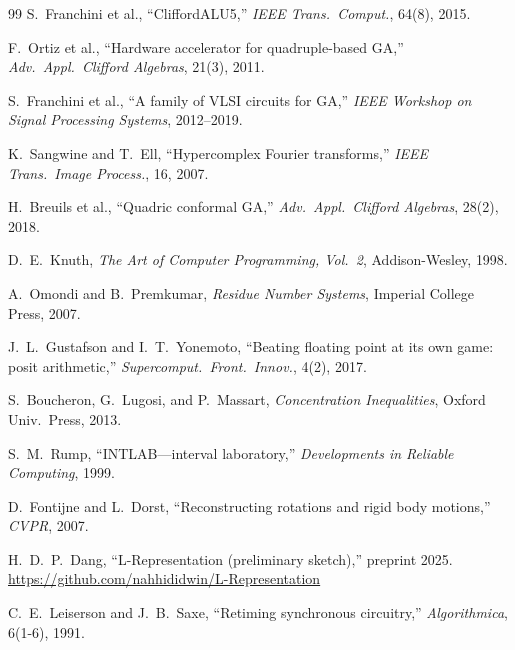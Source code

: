 \documentclass[11pt,a4paper]{article}
\theoremstyle{definition}
\theoremstyle{plain}
\theoremstyle{remark}
\begin{document}
\begin{thebibliography}{99}
S.~Franchini et al., ``CliffordALU5,''
\emph{IEEE Trans.\ Comput.}, 64(8), 2015.

F.~Ortiz et al., ``Hardware accelerator for quadruple-based GA,''
\emph{Adv.\ Appl.\ Clifford Algebras}, 21(3), 2011.

S.~Franchini et al., ``A family of VLSI circuits for GA,''
\emph{IEEE Workshop on Signal Processing Systems}, 2012--2019.

K.~Sangwine and T.~Ell,
``Hypercomplex Fourier transforms,''
\emph{IEEE Trans.\ Image Process.}, 16, 2007.

H.~Breuils et al., ``Quadric conformal GA,''
\emph{Adv.\ Appl.\ Clifford Algebras}, 28(2), 2018.

D.~E.~Knuth,
\emph{The Art of Computer Programming, Vol.~2}, Addison-Wesley, 1998.

A.~Omondi and B.~Premkumar,
\emph{Residue Number Systems}, Imperial College Press, 2007.

J.~L.~Gustafson and I.~T.~Yonemoto,
``Beating floating point at its own game: posit arithmetic,''
\emph{Supercomput.\ Front.\ Innov.}, 4(2), 2017.

S.~Boucheron, G.~Lugosi, and P.~Massart,
\emph{Concentration Inequalities}, Oxford Univ.\ Press, 2013.

S.~M.~Rump,
``INTLAB---interval laboratory,''
\emph{Developments in Reliable Computing}, 1999.

D.~Fontijne and L.~Dorst,
``Reconstructing rotations and rigid body motions,'' \emph{CVPR}, 2007.

H.~D.~P.~Dang,
``L-Representation (preliminary sketch),'' preprint 2025.
\url{https://github.com/nahhididwin/L-Representation}

C.~E.~Leiserson and J.~B.~Saxe,
``Retiming synchronous circuitry,''
\emph{Algorithmica}, 6(1-6), 1991.

\end{thebibliography}
\end{document}
